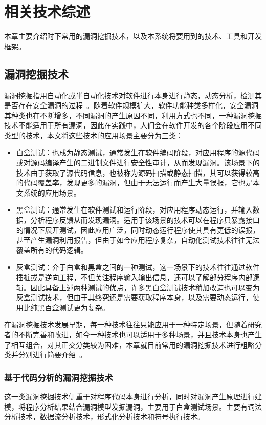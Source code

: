 \chapter{相关技术综述}
本章主要介绍时下常用的漏洞挖掘技术，以及本系统将要用到的技术、工具和开发框架。

\section{漏洞挖掘技术}
漏洞挖掘指用自动化或半自动化技术对软件进行本身进行静态，动态分析，检测其是否存在安全漏洞的过程~\cite{liujian2018}。随着软件规模扩大，软件功能种类多样化，安全漏洞其种类也在不断增多，不同漏洞的产生原因不同，利用方式也不同，一种漏洞挖掘技术不能适用于所有漏洞，因此在实践中，人们会在软件开发的各个阶段应用不同类型的技术，本文将这些技术的应用场景主要分为三类：
\begin{itemize}
    \item  白盒测试：也成为静态测试，通常发生在软件编码阶段，对应用程序的源代码或对源码编译产生的二进制文件进行安全性审计，从而发现漏洞。该场景下的技术由于获取了源代码信息，也被称为源码扫描或静态扫描，其可以获得较高的代码覆盖率，发现更多的漏洞，但由于无法运行而产生大量误报，它也是本文系统的应用场景。
    \item 黑盒测试：通常发生在软件测试和运行阶段，对应用程序动态运行，并输入数据，分析程序反馈从而发现漏洞。适用于该场景的技术可以在程序只暴露接口的情况下展开测试，因此应用广泛，同时动态运行程序使其具有更低的误报，甚至产生漏洞利用报告，但由于如今应用程序复杂，自动化测试技术往往无法覆盖所有的代码逻辑。
    \item 灰盒测试：介于白盒和黑盒之间的一种测试，这一场景下的技术往往通过软件插桩或是逆向工程，不但关注程序输入输出信息，还可以了解部分程序内部逻辑。因此具备上述两种测试的优点，许多黑白盒测试技术稍加改造也可以变为灰盒测试技术，但由于其终究还是需要获取程序本身，以及需要动态运行，使用比纯黑百盒测试更为复杂。
\end{itemize}

在漏洞挖掘技术发展早期，每一种技术往往只能应用于一种特定场景，但随着研究者的不断完善和改进，如今一种技术也可以适用于多种场景，并且技术本身也产生了相互组合，对其正交分类较为困难，本章就目前常用的漏洞挖掘技术进行粗略分类并分别进行简要介绍~\cite{liujian2018,meihong2009}。


\subsection{基于代码分析的漏洞挖掘技术}
这一类漏洞挖掘技术侧重于对程序代码本身进行分析，同时对漏洞产生原理进行建模，将程序分析结果结合漏洞模型发掘漏洞，主要用于白盒测试场景。主要有词法分析技术，数据流分析技术，形式化分析技术和符号执行技术。\\
\vspace{1cm}
